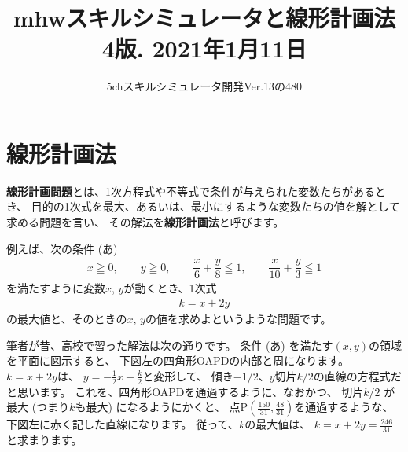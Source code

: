 \documentclass{jsarticle}
\title{mhwスキルシミュレータと線形計画法
\\
{\small 4版. 2021年1月11日}
}
\date{}
\author{5chスキルシミュレータ開発Ver.13の480}
\begin{document}
\maketitle
\tableofcontents

\section{線形計画法}
{\bf 線形計画問題}とは、1次方程式や不等式で条件が与えられた変数たちがあるとき、
目的の1次式を最大、あるいは、最小にするような変数たちの値を解として求める問題を言い、
その解法を{\bf 線形計画法}と呼びます。

例えば、次の条件 (あ)
%
\begin{align*}
x \geqq 0 , \qquad
y \geqq 0 , \qquad
\dfrac{x}{6} + \dfrac{y}{8} \leqq 1 , \qquad
\dfrac{x}{10} + \dfrac{y}{3} \leqq 1
\tag{あ}
\end{align*}
%
を満たすように変数$x$, $y$が動くとき、1次式
\begin{align*}
k = x + 2y
\end{align*}
の最大値と、そのときの$x$, $y$の値を求めよというような問題です。

筆者が昔、高校で習った解法は次の通りです。
条件 (あ) を満たす$(x,y)$の領域を平面に図示すると、
下図左の四角形OAPDの内部と周になります。
$k = x+2y$は、
$y = -\frac{1}{2}x + \frac{k}{2}$と変形して、
傾き$-1/2$、$y$切片$k/2$の直線の方程式だと思います。
これを、四角形OAPDを通過するように、なおかつ、
切片$k/2$ が最大 (つまり$k$も最大) になるようにかくと、
点P$(\frac{150}{31}, \frac{48}{31})$を通過するような、
下図左に赤く記した直線になります。
従って、$k$の最大値は、
$k = x + 2y = \frac{246}{31}$と求まります。
\end{document}
